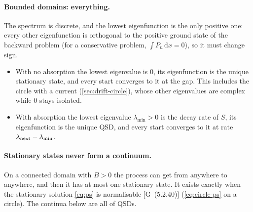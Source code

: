 \documentclass[11pt]{article}
\numberwithin{equation}{section}
\newcommand{\dd}{\mathrm{d}}
\newcommand{\G}[1]{[G~(#1)]}
\begin{document}
\paragraph{Bounded domains: everything.} The spectrum is discrete, and the lowest eigenfunction is the only
positive one: every other eigenfunction is orthogonal to the positive ground state of the backward problem
(for a conservative problem, $\int P_n\,\dd x=0$), so it must change sign.
\begin{itemize}
  \item With no absorption the lowest eigenvalue is $0$, its eigenfunction is the unique stationary state, and
        every start converges to it at the gap. This includes the circle with a current
        (\cref{sec:drift-circle}), whose other eigenvalues are complex while $0$ stays isolated.
  \item With absorption the lowest eigenvalue $\lambda_{\min}>0$ is the decay rate of $S$, its eigenfunction
        is the unique QSD, and every start converges to it at rate $\lambda_{\rm next}-\lambda_{\min}$.
\end{itemize}

\paragraph{Stationary states never form a continuum.} On a connected domain with $B>0$ the process can get
from anywhere to anywhere, and then it has at most one stationary state. It exists exactly when the stationary
solution \cref{eq:ps} is normalisable \G{5.2.40} (\cref{eq:circle-ps} on a circle). The continua below are all
of QSDs.
\end{document}
